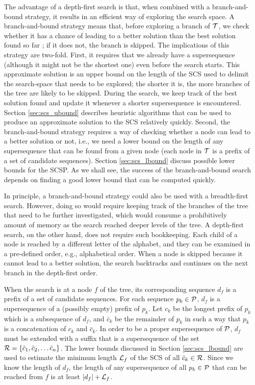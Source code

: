The advantage of a depth-first search is that, when combined with a
branch-and-bound strategy, it results in an efficient way of exploring the
search space. A branch-and-bound strategy means that, before exploring a branch
of ${\mathcal{T}}$, we check whether it has a chance of leading to a better solution
than the best solution found so far \citep{Horowitz1996}; if it does not, the
branch is skipped. The implications of this strategy are two-fold. First, it
requires that we already have a supersequence (although it might not be the
shortest one) even before the search starts. This approximate solution is an
upper bound on the length of the SCS used to delimit the search-space that needs
to be explored; the shorter it is, the more branches of the tree are likely to
be skipped. During the search, we keep track of the best solution found and
update it whenever a shorter supersequence is encountered. Section
\ref{sec:scs_ubound} describes heuristic algorithms that can be used to produce
an approximate solution to the SCS relatively quickly. Second, the
branch-and-bound strategy requires a way of checking whether a node can lead to
a better solution or not, i.e., we need a lower bound on the length of any
supersequence that can be found from a given node (each node in ${\mathcal{T}}$ is a
prefix of a set of candidate sequences). Section \ref{sec:scs_lbound}
discuss possible lower bounds for the SCSP. As we shall see, the success of the
branch-and-bound search depends on finding a good lower bound that can be
computed quickly.

In principle, a branch-and-bound strategy could also be used with a
breadth-first search. However, doing so would require keeping track of the
branches of the tree that need to be further investigated, which would consume a
prohibitively amount of memory as the search reached deeper levels of the tree.
A depth-first search, on the other hand, does not require such bookkeeping. Each
child of a node is reached by a different letter of the alphabet, and they can
be examined in a pre-defined order, e.g., alphabetical order. When a node is
skipped because it cannot lead to a better solution, the search backtracks and
continues on the next branch in the depth-first order.

When the search is at a node $f$ of the tree, its corresponding sequence $d_f$
is a prefix of a set of candidate sequences. For each sequence
$p_k \in {\mathcal{P}}$, $d_f$ is a supersequence of a (possibly empty) prefix of $p_k$.
Let $c_k$ be the longest prefix of $p_k$ which is a subsequence of $d_f$, and
$\bar{c}_k$ be the remainder of $p_k$ in such a way that $p_k$ is a
concatenation of $c_k$ and $\bar{c}_k$. In order to be a proper supersequence of
${\mathcal{P}}$, $d_f$ must be extended with a suffix that is a supersequence of the set
${\mathcal{R}} = \{\bar{c}_1, \bar{c}_2, \ldots \bar{c}_n\}$. The lower bounds discussed
in Section \ref{sec:scs_lbound} are used to estimate the minimum length ${\mathcal{L}}_f$ of
the SCS of all $\bar{c}_k \in {\mathcal{R}}$. Since we know the length of $d_f$, the
length of any supersequence of all $p_k \in {\mathcal{P}}$ that can be reached from $f$
is at least $|d_f| + {\mathcal{L}}_f$.

